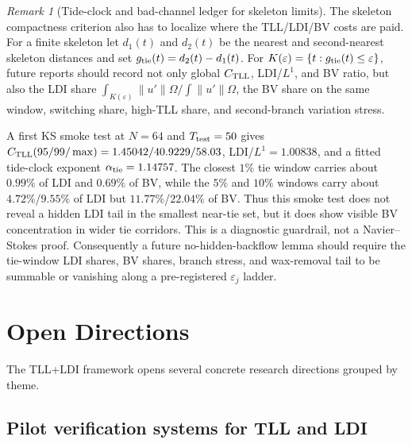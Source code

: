 \documentclass[12pt,a4paper]{article}
\theoremstyle{definition}
\theoremstyle{plain}
\theoremstyle{remark}
\newtheorem{remark}[definition]{Remark}
\begin{document}
\begin{remark}[Tide-clock and bad-channel ledger for skeleton limits]
\label{rem:tide-clock-ledger}
The skeleton compactness criterion also has to localize where the
TLL/LDI/BV costs are paid.  For a finite skeleton let \(d_1(t)\)
and \(d_2(t)\) be the nearest and second-nearest skeleton distances
and set \(g_{\rm tie}(t)=d_2(t)-d_1(t)\).  For
\(K(\varepsilon)=\{t:g_{\rm tie}(t)\le \varepsilon\}\), future reports
should record not only global \(C_{\rm TLL}\), LDI/\(L^1\), and BV
ratio, but also the LDI share
\(\int_{K(\varepsilon)}\|u'\|\Omega/\int\|u'\|\Omega\), the BV share
on the same window, switching share, high-TLL share, and second-branch
variation stress.

A first KS smoke test at \(N=64\) and \(T_{\rm test}=50\) gives
\(C_{\rm TLL}(95/99/\max)=1.45042/40.9229/58.03\),
LDI/\(L^1=1.00838\), and a fitted tide-clock exponent
\(\alpha_{\rm tie}=1.14757\).  The closest \(1\%\) tie window carries
about \(0.99\%\) of LDI and \(0.69\%\) of BV, while the \(5\%\) and
\(10\%\) windows carry about \(4.72\%\)/\(9.55\%\) of LDI but
\(11.77\%\)/\(22.04\%\) of BV.  Thus this smoke test does not reveal a
hidden LDI tail in the smallest near-tie set, but it does show visible
BV concentration in wider tie corridors.  This is a diagnostic
guardrail, not a Navier--Stokes proof.  Consequently a future
no-hidden-backflow lemma should require the tie-window LDI shares, BV
shares, branch stress, and wax-removal tail to be summable or vanishing
along a pre-registered \(\varepsilon_j\) ladder.
\end{remark}

\section{Open Directions}
\label{sec:open-directions}

The TLL+LDI framework opens several concrete research directions
grouped by theme.

\subsection{Pilot verification systems for TLL and LDI}
\end{document}
